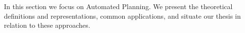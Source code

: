 In this section we focus on Automated Planning.
We present the theoretical definitions and representations, common applications, and situate our thesis in relation to these approaches.



